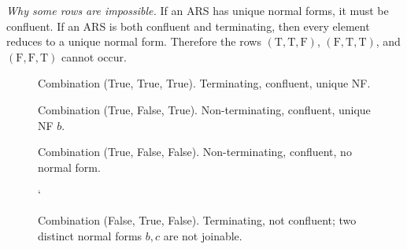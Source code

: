 \documentclass{article}
\theoremstyle{plain}
\theoremstyle{definition}
\theoremstyle{remark}
\begin{document}
\noindent\textit{Why some rows are impossible.}
If an ARS has unique normal forms, it must be confluent.
If an ARS is both confluent and terminating, then every element reduces to a unique normal form.
Therefore the rows \((\text{T},\text{T},\text{F})\), \((\text{F},\text{T},\text{T})\), and \((\text{F},\text{F},\text{T})\) cannot occur.

\begin{figure}[H]
\centering
{}
\caption{Combination (True, True, True). Terminating, confluent, unique NF.}
\label{fig:combo-ttt}
\end{figure}

\begin{figure}[H]
\centering
{}
\caption{Combination (True, False, True). Non-terminating, confluent, unique NF $b$.}
\label{fig:combo-tft}
\end{figure}

\begin{figure}[H]
\centering
{}
\caption{Combination (True, False, False). Non-terminating, confluent, no normal form.}
\label{fig:combo-tff}
\end{figure}

\begin{figure}[H]
\centering
{}
\caption{Combination (False, True, False). Terminating, not confluent; two distinct normal forms $b,c$ are not joinable.}
\label{fig:combo-ftf}
`\end{figure}
\end{document}
